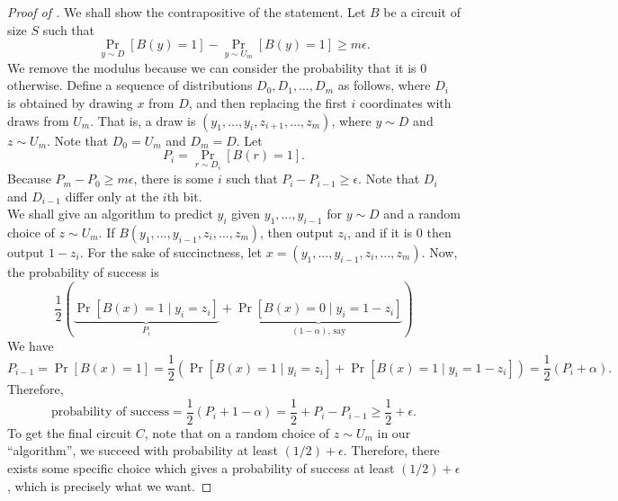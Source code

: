 		\begin{proof}[Proof of ]
			We shall show the contrapositive of the statement. Let $B$ be a circuit of size $S$ such that
			\[ \Pr_{y \sim D} [B(y) = 1] - \Pr_{y \sim U_m}[B(y) = 1] \ge m\epsilon. \]
			We remove the modulus because we can consider the probability that it is $0$ otherwise. Define a sequence of distributions $D_0,D_1,\ldots,D_m$ as follows, where $D_i$ is obtained by drawing $x$ from $D$, and then replacing the first $i$ coordinates with draws from $U_m$. That is, a draw is $(y_1,\ldots,y_i,z_{i+1},\ldots,z_m)$, where $y \sim D$ and $z \sim U_m$. Note that $D_0 = U_m$ and $D_m = D$. Let
			\[ P_i = \Pr_{r \sim D_i} [B(r) = 1]. \]
			Because $P_m - P_0 \ge m\epsilon$, there is some $i$ such that $P_i - P_{i-1} \ge \epsilon$. %
			Note that $D_i$ and $D_{i-1}$ differ only at the $i$th bit.\\
			We shall give an algorithm to predict $y_i$ given $y_1,\ldots,y_{i-1}$ for $y \sim D$ and a random choice of $z \sim U_m$. If $B(y_1,\ldots,y_{i-1},z_{i},\ldots,z_m)$, then output $z_i$, and if it is $0$ then output $1-z_i$. For the sake of succinctness, let $x = (y_1,\ldots,y_{i-1},z_i,\ldots,z_m)$. Now, the probability of success is
			\[ \frac{1}{2} \left( \underbrace{\Pr[B(x) = 1 \mid y_i = z_i]}_{P_i} + \underbrace{\Pr[B(x) = 0 \mid y_i = 1-z_i]}_{(1-\alpha)\text{, say}} \right) \]
			We have
			\[ P_{i-1} = \Pr[B(x) = 1] = \frac{1}{2} \left( \Pr[B(x) = 1 \mid y_i = z_i] + \Pr[B(x) = 1 \mid y_i = 1-z_i] \right) = \frac{1}{2} (P_i + \alpha). \]
			Therefore,
			\[ \text{probability of success} = \frac{1}{2}(P_i + 1-\alpha) = \frac{1}{2} + P_i - P_{i-1} \ge \frac{1}{2} + \epsilon. \]
			To get the final circuit $C$, note that on a random choice of $z \sim U_m$ in our ``algorithm'', we succeed with probability at least $(1/2)+\epsilon$. Therefore, there exists some specific choice which gives a probability of success at least $(1/2)+\epsilon$, which is precisely what we want.
		\end{proof}


